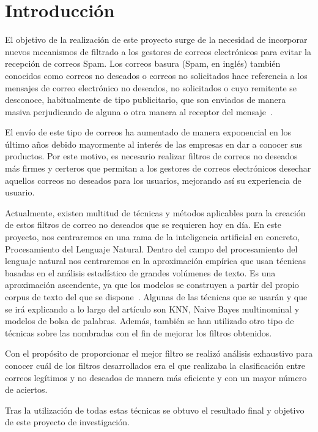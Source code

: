 \documentclass[conference,a4paper]{IEEEtran}
\begin{document}
\section{Introducción}

El objetivo de la realización de este proyecto surge de la necesidad de incorporar nuevos mecanismos de filtrado a los gestores de correos electrónicos para evitar la recepción de correos Spam. Los correos basura (Spam, en inglés) también conocidos como correos no deseados o correos no solicitados hace referencia a los mensajes de correo electrónico no deseados, no solicitados o cuyo remitente se desconoce, habitualmente de tipo publicitario, que son enviados de manera masiva perjudicando de alguna o otra manera al receptor del mensaje~\cite{b1}.

El envío de este tipo de correos ha aumentado de manera exponencial en los último años debido mayormente al interés de las empresas en dar a conocer sus productos. Por este motivo, es necesario realizar filtros de correos no deseados más firmes y certeros que permitan a los gestores de correos electrónicos desechar aquellos correos no deseados para los usuarios, mejorando así su experiencia de usuario.

Actualmente, existen multitud de técnicas y métodos aplicables para la creación de estos  filtros  de correo no deseados que se requieren hoy en día. En este proyecto, nos centraremos en una rama de la inteligencia artificial en concreto, Procesamiento del Lenguaje Natural. Dentro del campo del procesamiento del lenguaje natural nos centraremos en la aproximación empírica que usan técnicas basadas en el análisis estadístico de
grandes volúmenes de texto. Es una aproximación ascendente, ya que los modelos
se construyen a partir del propio corpus de texto del que se dispone~\cite{b2}. Algunas de las técnicas que se usarán  y que se irá explicando a lo largo del artículo son KNN, Naive Bayes multinominal y modelos de bolsa de palabras. Además, también se han utilizado otro tipo de técnicas sobre las nombradas con el fin de mejorar los filtros obtenidos. 

Con el propósito de proporcionar el mejor filtro  se realizó análisis exhaustivo para conocer cuál de los filtros desarrollados era el que realizaba la clasificación entre correos legítimos y no deseados de manera más eficiente y con un mayor número de aciertos. 

Tras la utilización de todas estas técnicas se obtuvo el resultado final y objetivo de este proyecto de investigación.
\end{document}
